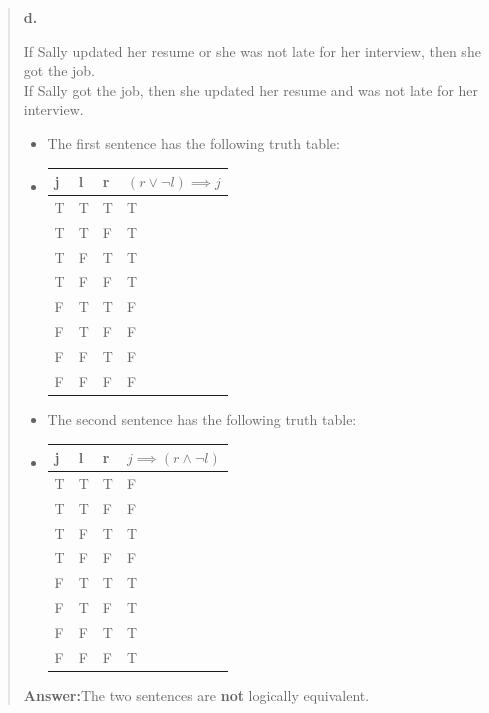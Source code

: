 \documentclass[11pt, oneside]{article}
\begin{document}
\begin{quote}
    \textbf{d. }
    
    If Sally updated her resume or she was not late for her interview, then she got the job. \\
    If Sally got the job, then she updated her resume and was not late for her interview.

    \begin{itemize}
        \item The first sentence has the following truth table:
        \item
            \begin{tabular}{ |p{0.5cm}|p{0.5cm}|p{0.5cm}|p{3cm}|  }
                \hline
                j & l & r & $(r \lor \neg l) \implies j$ \\
                \hline
                T & T & T & T \\
                T & T & F & T \\
                T & F & T & T \\
                T & F & F & T \\
                F & T & T & F \\
                F & T & F & F \\
                F & F & T & F \\
                F & F & F & F \\
                \hline
            \end{tabular}
        \item The second sentence has the following truth table:
        \item
            \begin{tabular}{ |p{0.5cm}|p{0.5cm}|p{0.5cm}|p{3cm}|  }
                \hline
                j & l & r & $j \implies (r \land \neg l)$ \\
                \hline
                T & T & T & F \\
                T & T & F & F \\
                T & F & T & T \\
                T & F & F & F \\
                F & T & T & T \\
                F & T & F & T \\
                F & F & T & T \\
                F & F & F & T \\
                \hline
            \end{tabular}
    \end{itemize}

    \textbf{Answer:}\enspace The two sentences are \textbf{not} logically equivalent.
\end{quote}
\end{document}
